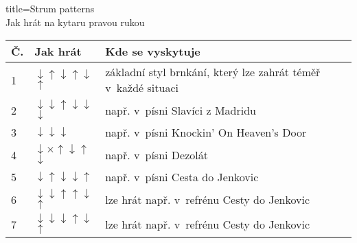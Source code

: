 \begin{song}{title=\centering Strum patterns \\\normalsize Jak hrát na kytaru pravou rukou \vspace*{-0.3cm}}  %

\newcommand{\up}{$\uparrow$} %
\newcommand{\dn}{$\downarrow$} %
\newcommand{\x}{$\times$} %
\newcommand{\tu}{\textunderscore} %
\centering
\mezera 

\renewcommand{\arraystretch}{1.4}
\begin{tabular}{l  l  l}
\hline\hline 
Č. & Jak hrát & Kde se vyskytuje  \\ \hline
1  & \dn \up \dn \up \dn \up & základní styl brnkání, který lze zahrát téměř v~každé situaci\\
2  & \dn \tu \dn \up \dn \tu \dn \tu \dn & např. v~písni Slavíci z Madridu  \\
3  & \dn \tu \tu \tu \dn \tu \dn & např. v~písni Knockin' On Heaven's Door  \\
4  & \dn \x  \up \dn \up \dn & např. v~písni Dezolát \\
5  & \dn \up \dn \tu \dn \up & např. v~písni Cesta do Jenkovic \\
6  & \dn \tu \dn \up \tu \up \dn \up & lze hrát např. v~refrénu Cesty do Jenkovic \\
7  & \dn \tu \dn \tu \dn \up \dn \up & lze hrát např. v~refrénu Cesty do Jenkovic \\
\hline \hline
\end{tabular}



	
\setcounter{Slokočet}{0}
\end{song}



